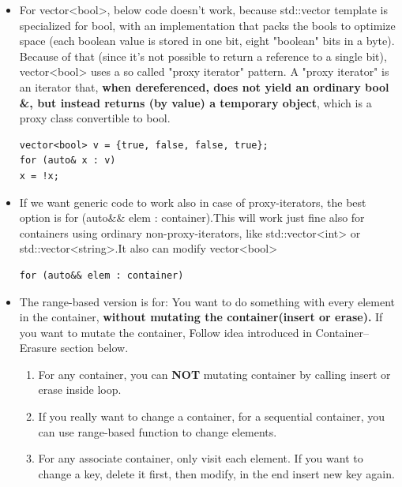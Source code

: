 \documentclass[a4paper,11pt,twoside]{book}
\begin{document}
\begin{itemize}
\begin{enumerate}
	\end{enumerate}
	
	
	\item For vector<bool>, below code doesn't work, because std::vector template is specialized for bool, with an implementation that packs the bools to optimize space (each boolean value is stored in one bit, eight "boolean" bits in a byte). Because of that (since it's not possible to return a reference to a single bit), vector<bool> uses a so called "proxy iterator" pattern. A "proxy iterator" is an iterator that, \textbf{when dereferenced, does not yield an ordinary bool \&, but instead returns (by value) a temporary object}, which is a proxy class convertible to bool. 
\begin{lstlisting}[numbers=none]
vector<bool> v = {true, false, false, true};
for (auto& x : v)
x = !x;
\end{lstlisting}

	
	\item If we want generic code to work also in case of proxy-iterators, the best option is for (auto\&\& elem : container).This will work just fine also for containers using ordinary non-proxy-iterators, like std::vector<int> or std::vector<string>.It also can modify vector<bool> 
\begin{lstlisting}[numbers=none]
for (auto&& elem : container)
\end{lstlisting}
	
	\item The range-based version is for: You want to do something with every element in the container, \textbf{without mutating the container(insert or erase).} If you want to mutate the container, Follow idea introduced in Container--Erasure section below.
	
	\begin{enumerate}
		\item For any container, you can \textbf{NOT} mutating container by calling insert or erase inside loop.
		
		\item If you really want to change a container, for a sequential container, you can use range-based function to change elements. 
		
		\item For any associate container, only visit each element. If you want to change a key, delete it first, then modify, in the end insert new key again. 
	\end{enumerate}
	
\end{itemize}
\end{document}
